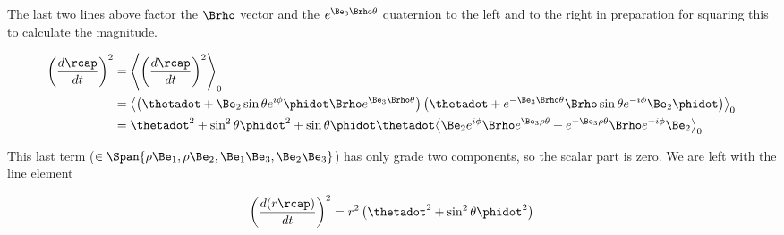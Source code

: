 The last two lines above factor the $\Brho$ vector and the $e^{\Be_3 \Brho \theta}$ quaternion to the left and to the right in preparation for squaring this to calculate the magnitude.

\begin{align*}
\left( \frac{d\rcap}{dt} \right)^2
&=
\gpgradezero{ \left( \frac{d\rcap}{dt} \right)^2 } \\
&=
\gpgradezero{ 
\left( \thetadot + \Be_2 \sin\theta e^{i\phi} \phidot \Brho e^{\Be_3 \Brho \theta} \right) 
\left(\thetadot + e^{-\Be_3 \Brho \theta} \Brho \sin\theta e^{-i\phi} \Be_2 \phidot\right) } \\
&=
\thetadot^2 + \sin^2\theta \phidot^2
+ \sin\theta \phidot \thetadot
\gpgradezero{ 
\Be_2 e^{i\phi} \Brho e^{\Be_3 \rho \theta}
+e^{-\Be_3 \rho \theta} \Brho e^{-i\phi} \Be_2
} \\
\end{align*}

This last term ($\in \Span \{\rho\Be_1, \rho\Be_2, \Be_1\Be_3, \Be_2\Be_3\}$) has only grade two components, so the scalar part is zero.  We are left with the line element 

\begin{align}\label{eqn:sphericalPolarUnit:yoo4}
\left(\frac{d (r\rcap)}{dt}\right)^2 = r^2 \left( \thetadot^2 + \sin^2\theta \phidot^2 \right)
\end{align}

\EndArticle
